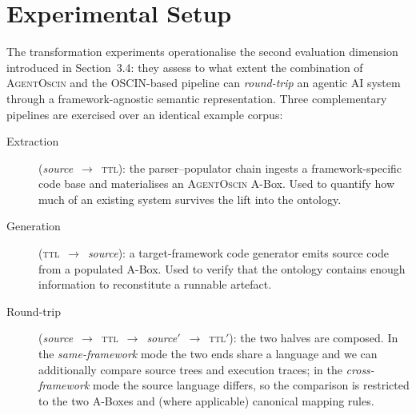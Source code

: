 
\section{Experimental Setup}\label{sec:transformation-setup}

The transformation experiments operationalise the second evaluation
dimension introduced in Section~3.4: they assess to what extent the
combination of \textsc{AgentOscin} and the OSCIN-based pipeline can
\emph{round-trip} an agentic AI system through a framework-agnostic
semantic representation. Three complementary pipelines are exercised
over an identical example corpus:

\begin{description}
  \item[Extraction] (\textit{source}~$\rightarrow$~\textsc{ttl}): the
    parser--populator chain ingests a framework-specific code base and
    materialises an \textsc{AgentOscin} A-Box. Used to quantify how
    much of an existing system survives the lift into the ontology.
  \item[Generation] (\textsc{ttl}~$\rightarrow$~\textit{source}): a
    target-framework code generator emits source code from a populated
    A-Box. Used to verify that the ontology contains enough information
    to reconstitute a runnable artefact.
  \item[Round-trip] (\textit{source}~$\rightarrow$~\textsc{ttl}~$\rightarrow$~\textit{source$'$}~$\rightarrow$~\textsc{ttl$'$}):
    the two halves are composed. In the
    \emph{same-framework} mode the two ends share a language and we can
    additionally compare source trees and execution traces; in the
    \emph{cross-framework} mode the source language differs, so the
    comparison is restricted to the two A-Boxes and (where applicable)
    canonical mapping rules.
\end{description}


